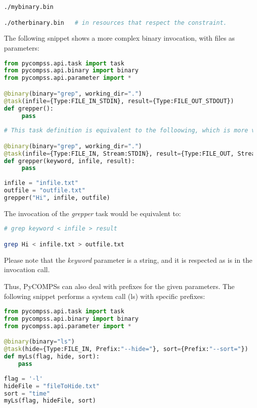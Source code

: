 \begin{lstlisting}[language=bash]
./mybinary.bin 

./otherbinary.bin   # in resources that respect the constraint.
\end{lstlisting}

The following snippet shows a more complex binary invocation, with files as parameters:

\begin{lstlisting}[language=python]
from pycompss.api.task import task
from pycompss.api.binary import binary
from pycompss.api.parameter import *

@binary(binary="grep", working_dir=".")
@task(infile={Type:FILE_IN_STDIN}, result={Type:FILE_OUT_STDOUT})
def grepper():
     pass
     
# This task definition is equivalent to the folloowing, which is more verbose:

@binary(binary="grep", working_dir=".")
@task(infile={Type:FILE_IN, Stream:STDIN}, result={Type:FILE_OUT, Stream:STDOUT})
def grepper(keyword, infile, result):
     pass
     
infile = "infile.txt"
outfile = "outfile.txt"
grepper("Hi", infile, outfile)
\end{lstlisting}

The invocation of the {\it grepper} task would be equivalent to:

\begin{lstlisting}[language=bash]
# grep keyword < infile > result

grep Hi < infile.txt > outfile.txt
\end{lstlisting}

Please note that the {\it keyword} parameter is a string, and it is respected as is in the invocation call.

Thus, PyCOMPSs can also deal with prefixes for the given parameters. 
The following snippet performs a system call (ls) with specific prefixes:

\begin{lstlisting}[language=python]
from pycompss.api.task import task
from pycompss.api.binary import binary
from pycompss.api.parameter import *

@binary(binary="ls")
@task(hide={Type:FILE_IN, Prefix:"--hide="}, sort={Prefix:"--sort="})
def myLs(flag, hide, sort):
    pass
    
flag = '-l'
hideFile = "fileToHide.txt"
sort = "time"
myLs(flag, hideFile, sort)
\end{lstlisting}

